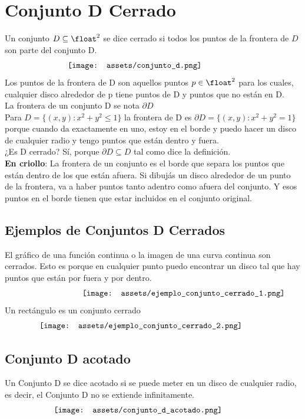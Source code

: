 \documentclass[10pt,a4paper]{article}
\begin{document}
\section*{Conjunto D Cerrado}
Un conjunto $D \subseteq \float^{2}$ se dice cerrado si todos los puntos de la frontera de $D$ son parte del conjunto D.
\[\begin{minipage}[b]{0.6\textwidth}
    \texttt{[image: assets/conjunto\_d.png]}
\end{minipage}\]
Los puntos de la frontera de D son aquellos puntos $p \in \float^{2}$ para los cuales, cualquier disco alrededor de p tiene puntos de D y puntos que no están en D. \\
La frontera de un conjunto D se nota $\partial D$ \\

Para $D = \{(x,y): x^{2} + y^{2} \le 1 \}$ la frontera de D es $\partial D = \{(x,y): x^{2} + y^{2} = 1\}$ porque cuando da exactamente en uno, estoy en el borde y puedo hacer un disco de cualquier radio y tengo puntos que están dentro y fuera. \\
¿Es D cerrado? Sí, porque $\partial D \subseteq D$ tal como dice la definición. \\

\textbf{En criollo}: La frontera de un conjunto es el borde que separa los puntos que están dentro de los que están afuera. Si dibujás un disco alrededor de un punto de la frontera, va a haber puntos tanto adentro como afuera del conjunto. Y esos puntos en el borde tienen que estar incluidos en el conjunto original.
\subsection*{Ejemplos de Conjuntos D Cerrados}
El gráfico de una función continua o la imagen de una curva continua son cerrados. Esto es porque en cualquier punto puedo encontrar un disco tal que hay puntos que están por fuera y por dentro.
\[\begin{minipage}[b]{0.5\textwidth}
    \texttt{[image: assets/ejemplo\_conjunto\_cerrado\_1.png]}
\end{minipage}\]
Un rectángulo es un conjunto cerrado
\[\begin{minipage}[b]{0.8\textwidth}
    \texttt{[image: assets/ejemplo\_conjunto\_cerrado\_2.png]}
\end{minipage}\]
\subsection*{Conjunto D acotado}
Un Conjunto D se dice acotado si se puede meter en un disco de cualquier radio, es decir, el Conjunto D no se extiende infinitamente.
\[\begin{minipage}[b]{0.7\textwidth}
    \texttt{[image: assets/conjunto\_d\_acotado.png]}
\end{minipage}\]
\end{document}
